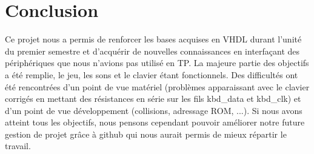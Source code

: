 \section{Conclusion}
Ce projet nous a permis de renforcer les bases acquises en VHDL durant l'unité du premier semestre et d'acquérir de nouvelles connaissances en interfaçant des périphériques que nous n'avions pas utilisé en TP.
La majeure partie des objectifs a été remplie, le jeu, les sons et le clavier étant fonctionnels. Des difficultés ont été rencontrées d'un point de vue matériel (problèmes apparaissant avec le clavier corrigés en mettant des résistances en série sur les fils kbd\_data et kbd\_clk) et d'un point de vue développement (collisions, adressage ROM, ...). Si nous avons atteint tous les objectifs, nous pensons cependant pouvoir améliorer notre future gestion de projet grâce à github qui nous aurait permis de mieux répartir le travail.

\newpage

